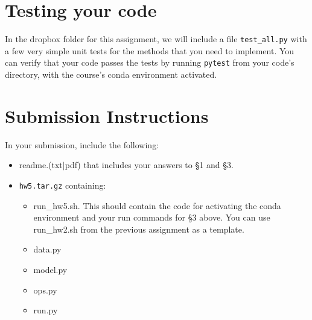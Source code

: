 \documentclass[11pt]{article}
\begin{document}
\section{Testing your code}

In the dropbox folder for this assignment, we will include a file \texttt{test\_all.py} with a few very simple unit tests for the methods that you need to implement.  You can verify that your code passes the tests by running \texttt{pytest} from your code's directory, with the course's conda environment activated.


\section*{Submission Instructions}

In your submission, include the following:
\begin{itemize}
  \item readme.(txt$\mid$pdf) that includes your answers to \S1 and \S3. 
  \item \texttt{hw5.tar.gz} containing:
  \begin{itemize}
    \item run\_hw5.sh.  This should contain the code for activating the conda environment and your run commands for \S3 above.  You can use run\_hw2.sh from the previous assignment as a template.
    \item data.py
    \item model.py
    \item ops.py
    \item run.py
  \end{itemize}
\end{itemize}
\end{document}

